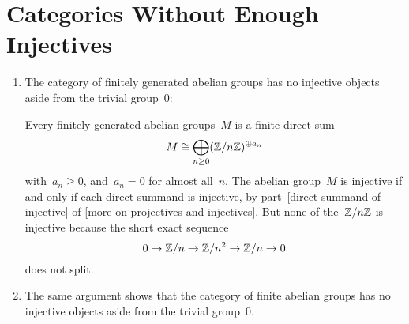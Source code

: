 \section{Categories Without Enough Injectives}


\begin{example}
  \leavevmode
  \begin{enumerate}
    \item
      The category of finitely generated abelian groups has no injective objects aside from the trivial group~$0$:
      
      Every finitely generated abelian groups~$M$ is a finite direct sum
      \[
        M
        \cong
        \bigoplus_{n \geq 0}
        (\mathbb{Z}/n\mathbb{Z})^{\oplus a_n}
      \]
      with~$a_n \geq 0$, and~$a_n = 0$ for almost all~$n$.
      The abelian group~$M$ is injective if and only if each direct summand is injective, by part~\ref*{direct summand of injective} of \cref{more on projectives and injectives}.
      But none of the~$\mathbb{Z}/n\mathbb{Z}$ is injective because the short exact sequence
      \[
        0
        \to
        \mathbb{Z}/n
        \to
        \mathbb{Z}/n^2
        \to
        \mathbb{Z}/n
        \to
        0
      \]
      does not split.
    \item
      The same argument shows that the category of finite abelian groups has no injective objects aside from the trivial group~$0$.
  \end{enumerate}
\end{example}




